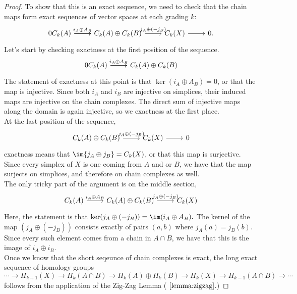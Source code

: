 \begin{proof}
To show that this is an exact sequence, we need to check that the chain maps form exact sequences of vector spaces at each grading $k$:
\[\begin{tikzcd}
0 \arrow{r} C_k(A)\arrow{r}{i_A\oplus A_B} & C_k(A)\oplus C_k(B) \arrow{r}{j_A\oplus (-j_B)} & C_k(X)\arrow{r} & 0.
\end{tikzcd}\]
Let's start by checking exactness at the first position of the sequence. 
\[
\begin{tikzcd}
0 \arrow{r} C_k(A)\arrow{r}{i_A\oplus A_B} & C_k(A)\oplus C_k(B)
\end{tikzcd}\]
The statement of exactness at this point is that $\ker (i_A\oplus A_B)=0$, or that the map is injective. Since both $i_A$ and $i_B$ are injective on simplices, their induced maps are injective on the chain complexes. The direct sum of injective maps along the domain is again injective, so we exactness at the first place. \\
At the last position of the sequence, 
\[
\begin{tikzcd}
C_k(A)\oplus C_k(B) \arrow{r}{j_A\oplus(- j_B)} & C_k(X)\arrow{r} & 0
\end{tikzcd}\]
exactness means that $\im{j_A\oplus j_B}=C_k(X)$, or that this map is surjective. Since every simplex of $X$ is one coming from $A$ and or $B$, we have that the map surjects on simplices, and therefore on chain complexes as well. \\
The only tricky part of the argument is on the middle section, 
\[ \begin{tikzcd} C_k(A)\arrow{r}{i_A\oplus A_B} & C_k(A)\oplus C_k(B) \arrow{r}{j_A\oplus(- j_B)} & C_k(X)\end{tikzcd}\]
Here, the statement is that $\ker(j_A\oplus(- j_B))=\im (i_A\oplus A_B). $ The kernel of the map $(j_A\oplus(- j_B))$ consists exactly of pairs $(a,b)$ where $j_A(a)=j_B(b)$. Since every such element comes from a chain in $A\cap B$, we have that this is the image of $i_A\oplus i_B$. \\
Once we know that the short seqeunce of chain complexes is exact, the long exact sequence of homology groups
 \[\cdots\to  H_{k+1}(X)\to H_k(A\cap B)\to H_k(A)\oplus H_k(B)\to H_k(X)\to H_{k-1} (A\cap B)\to \cdots \]
 follows from the application of the Zig-Zag Lemma ( $\ref{lemma:zigzag}$.)
\end{proof}
